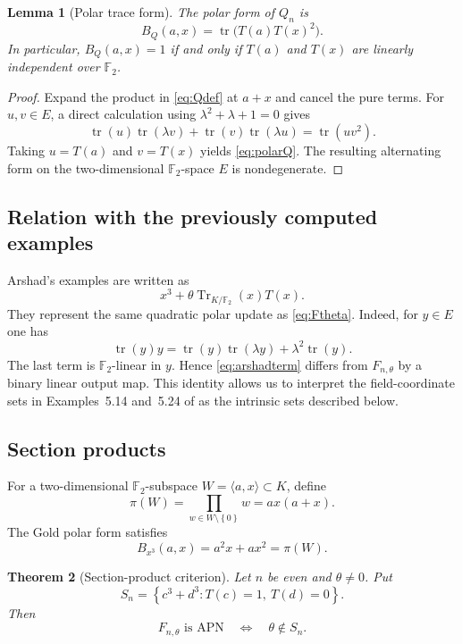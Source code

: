 \documentclass[pdflatex,sn-mathphys-num]{sn-jnl}
\theoremstyle{thmstyleone}
\newtheorem{theorem}{Theorem}[section]
\newtheorem{lemma}[theorem]{Lemma}
\theoremstyle{thmstyletwo}
\theoremstyle{thmstylethree}
\newcommand{\F}{\mathbb F}
\newcommand{\Tr}{\operatorname{Tr}}
\newcommand{\tr}{\operatorname{tr}}
\newcommand{\set}[1]{\left\{#1\right\}}
\begin{document}
\begin{lemma}[Polar trace form]\label{lem:polarQ}
The polar form of $Q_n$ is
\begin{equation}\label{eq:polarQ}
 B_Q(a,x)=\tr\bigl(T(a)T(x)^2\bigr).
\end{equation}
In particular, $B_Q(a,x)=1$ if and only if $T(a)$ and $T(x)$ are linearly independent over $\F_2$.
\end{lemma}

\begin{proof}
Expand the product in \eqref{eq:Qdef} at $a+x$ and cancel the pure terms.  For $u,v\in E$, a direct calculation using $\lambda^2+\lambda+1=0$ gives
\[
 \tr(u)\tr(\lambda v)+\tr(v)\tr(\lambda u)=\tr(uv^2).
\]
Taking $u=T(a)$ and $v=T(x)$ yields \eqref{eq:polarQ}.  The resulting alternating form on the two-dimensional $\F_2$-space $E$ is nondegenerate.
\end{proof}

\subsection{Relation with the previously computed examples}

Arshad's examples are written as
\begin{equation}\label{eq:arshadterm}
 x^3+\theta\Tr_{K/\F_2}(x)T(x).
\end{equation}
They represent the same quadratic polar update as \eqref{eq:Ftheta}.  Indeed, for $y\in E$ one has
\begin{equation}\label{eq:traceidentity}
 \tr(y)y=\tr(y)\tr(\lambda y)+\lambda^2\tr(y).
\end{equation}
The last term is $\F_2$-linear in $y$.  Hence \eqref{eq:arshadterm} differs from $F_{n,\theta}$ by a binary linear output map.  This identity allows us to interpret the field-coordinate sets in Examples~5.14 and~5.24 of \cite{Arshad2018} as the intrinsic sets described below.

\subsection{Section products}

For a two-dimensional $\F_2$-subspace $W=\langle a,x\rangle\subset K$, define
\[
 \pi(W)=\prod_{w\in W\setminus\set0}w=ax(a+x).
\]
The Gold polar form satisfies
\[
 B_{x^3}(a,x)=a^2x+ax^2=\pi(W).
\]

\begin{theorem}[Section-product criterion]\label{thm:section}
Let $n$ be even and $\theta\ne0$.  Put
\begin{equation}\label{eq:Sn}
 S_n=\set{c^3+d^3:T(c)=1,\ T(d)=0}.
\end{equation}
Then
\begin{equation}\label{eq:sectioncrit}
 F_{n,\theta}\text{ is APN}\quad\Longleftrightarrow\quad \theta\notin S_n.
\end{equation}
\end{theorem}
\end{document}
